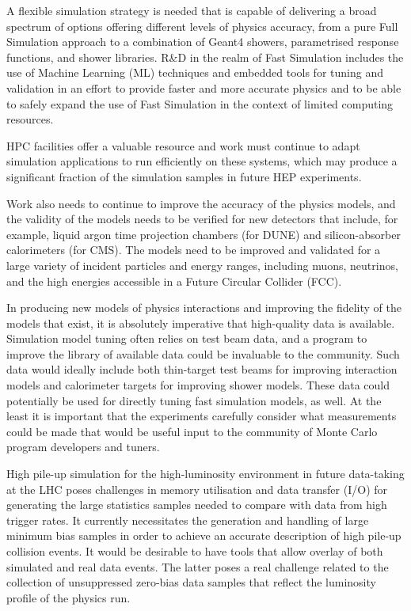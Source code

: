 \documentclass[12pt,a4paper]{article}
\begin{document}
A flexible simulation strategy is needed that is capable of delivering a
broad spectrum of options offering different levels of physics accuracy,
from a pure Full Simulation approach to a combination of Geant4 showers,
parametrised response functions, and shower libraries. R\&D in the realm
of Fast Simulation includes the use of Machine Learning (ML) techniques
and embedded tools for tuning and validation in an effort to provide
faster and more accurate physics and to be able to safely expand the use
of Fast Simulation in the context of limited computing resources.

HPC facilities offer a valuable resource and work must continue to adapt
simulation applications to run efficiently on these systems, which may
produce a significant fraction of the simulation samples in future HEP
experiments.

Work also needs to continue to improve the accuracy of the physics
models, and the validity of the models needs to be verified for new
detectors that include, for example, liquid argon time projection
chambers (for DUNE) and silicon-absorber calorimeters (for CMS). The
models need to be improved and validated for a large variety of incident
particles and energy ranges, including muons, neutrinos, and the high
energies accessible in a Future Circular Collider (FCC).

In producing new models of physics interactions and improving the
fidelity of the models that exist, it is absolutely imperative that
high-quality data is available. Simulation model tuning often relies on
test beam data, and a program to improve the library of available data
could be invaluable to the community. Such data would ideally include
both thin-target test beams for improving interaction models and
calorimeter targets for improving shower models. These data could
potentially be used for directly tuning fast simulation models, as well.
At the least it is important that the experiments carefully consider
what measurements could be made that would be useful input to the
community of Monte Carlo program developers and tuners.

High pile-up simulation for the high-luminosity environment in future
data-taking at the LHC poses challenges in memory utilisation and data
transfer (I/O) for generating the large statistics samples needed to
compare with data from high trigger rates. It currently necessitates the
generation and handling of large minimum bias samples in order to
achieve an accurate description of high pile-up collision events. It
would be desirable to have tools that allow overlay of both simulated
and real data events. The latter poses a real challenge related to the
collection of unsuppressed zero-bias data samples that reflect the
luminosity profile of the physics run.
\end{document}
